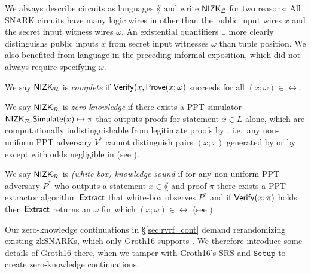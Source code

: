 We always describe circuits as languages $\lang$ and write ${\mathsf{NIZK}}_\mathcal{L}$ for two reasons: 
All SNARK circuits have many logic wires in \rel other than
the public input wires $x$ and the secret input witness wires $\omega$.
An existential quantifiers $\exists$ more clearly distinguishs
public inputs $x$ from secret input witnesses $\omega$ than tuple position.
We also benefited from language in the preceding informal exposition,
 which did not always require specifying $\omega$.

\begin{definition}\label{def:nizk_completeness}
We say ${\mathsf{NIZK}}_\mathcal{R}$ is {\em complete} if ${\mathsf{Verify}}(x, {\mathsf{Prove}}(x; \omega)$ succeeds for all $(x; \omega) \in \rel$.  %
\end{definition}

\def\advV{\ensuremath{V^*}\xspace} %

\begin{definition}\label{def:nizk_zero_knowledge}
We say ${\mathsf{NIZK}}_\mathcal{R}$ is {\em zero-knowledge} if
there exists a PPT simulator ${\mathsf{NIZK}}_\mathcal{R}.{\mathsf{Simulate}}(x) \mapsto \pi$
that outputs proofs for statement $x \in L$ alone, which are
computationally indistinguishable from legitimate proofs by \Prove,
i.e.\ any non-uniform PPT adversary \advV cannot distinguish pairs $(x; \pi)$
generated by \Simulate or by \Prove except with odds negligible in \secparam
(see \cite[Def. 9, \S A, pap. 29]{RandomizationGroth16}). %
\end{definition}

\def\advP{\ensuremath{P^*}\xspace} %

\begin{definition}\label{def:nizk_knowledge_sound}
We say ${\mathsf{NIZK}}_\mathcal{R}$ is {\em (white-box) knowledge sound} if
for any non-uniform PPT adversary \advP who outputs a statement $x \in \lang$ and proof $\pi$
there exists a PPT extractor algorithm ${\mathsf{Extract}}$ that white-box observes $\advP$ and
if ${\mathsf{Verify}}(x; \pi)$ holds then ${\mathsf{Extract}}$ returns an $\omega$ for which $(x; \omega) \in \rel$
(see \cite[Def. 7, \S A, pap. 29]{RandomizationGroth16}).
\end{definition}

Our zero-knowledge continuations in \S\ref{sec:rvrf_cont} demand
rerandomizing existing zkSNARKs, which only Groth16 supports \cite{Groth16}.
We therefore introduce some details of Groth16 \cite{Groth16} there,
when we tamper with Groth16's SRS and $\mathtt{Setup}$ to create zero-knowledge continuations. 

